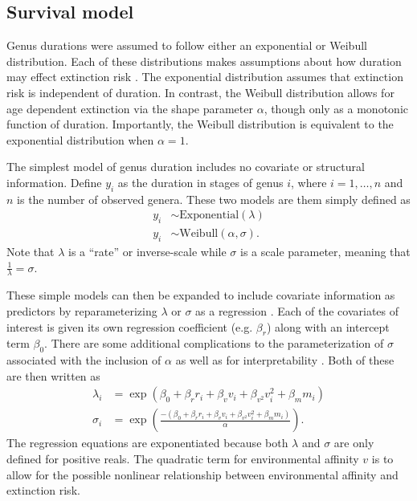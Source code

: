 \documentclass[12pt,letterpaper]{article}
\begin{document}
\subsection{Survival model}

Genus durations were assumed to follow either an exponential or Weibull distribution. Each of these distributions makes assumptions about how duration may effect extinction risk \citep{Klein2003}. The exponential distribution assumes that extinction risk is independent of duration. In contrast, the Weibull distribution allows for age dependent extinction via the shape parameter \(\alpha\), though only as a monotonic function of duration. Importantly, the Weibull distribution is equivalent to the exponential distribution when \(\alpha = 1\). %

The simplest model of genus duration includes no covariate or structural information. Define \(y_{i}\) as the duration in stages of genus \(i\), where \(i = 1, \dots, n\) and \(n\) is the number of observed genera. These two models are them simply defined as
\begin{equation}
  \begin{aligned}
    y_{i} &\sim \mathrm{Exponential}(\lambda) \\
    y_{i} &\sim \mathrm{Weibull}(\alpha, \sigma).
  \end{aligned}
  \label{eq:simple}
\end{equation}
Note that \(\lambda\) is a ``rate'' or inverse-scale while \(\sigma\) is a scale parameter, meaning that \(\frac{1}{\lambda} = \sigma\).

These simple models can then be expanded to include covariate information as predictors by reparameterizing \(\lambda\) or \(\sigma\) as a regression \citep{Klein2003}. Each of the covariates of interest is given its own regression coefficient (e.g. \(\beta_{r}\)) along with an intercept term \(\beta_{0}\). There are some additional complications to the parameterization of \(\sigma\) associated with the inclusion of \(\alpha\) as well as for interpretability \citep{Klein2003}. Both of these are then written as
\begin{equation}
  \begin{aligned}
    \lambda_{i} &= \exp(\beta_{0} + \beta_{r} r_{i} + \beta_{v} v_{i} + \beta_{v^{2}} v_{i}^{2} + \beta_{m} m_{i}) \\
    \sigma_{i} &= \exp\left(\frac{-(\beta_{0} + \beta_{r} r_{i} + \beta_{v} v_{i} + \beta_{v^{2}} v_{i}^{2} + \beta_{m} m_{i})}{\alpha}\right).
  \end{aligned}
  \label{eq:regression}
\end{equation}
The regression equations are exponentiated because both \(\lambda\) and \(\sigma\) are only defined for positive reals. The quadratic term for environmental affinity \(v\) is to allow for the possible nonlinear relationship between environmental affinity and extinction risk.
\end{document}
